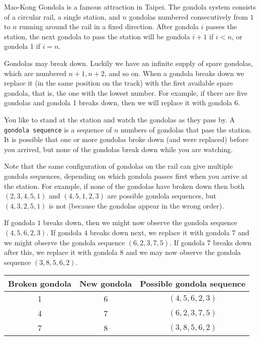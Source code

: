 Mao-Kong Gondola is a famous attraction in Taipei. The gondola system consists of a circular rail, a single station, and $n$ gondolas numbered consecutively from $1$ to $n$ running around the rail in a fixed direction. After gondola $i$ passes the station, the next gondola to pass the station will be gondola $i + 1$ if $i < n$, or gondola 1 if $i = n$.

Gondolas may break down. Luckily we have an infinite supply of spare gondolas, which are numbered $n + 1, n + 2$, and so on. When a gondola breaks down we replace it (in the same position on the track) with the first available spare gondola, that is, the one with the lowest number. For example, if there are five gondolas and gondola 1 breaks down, then we will replace it with gondola 6.

You like to stand at the station and watch the gondolas as they pass by. A \texttt{gondola sequence} is a sequence of $n$ numbers of gondolas that pass the station. It is possible that one or more gondolas broke down (and were replaced) before you arrived, but none of the gondolas break down while you are watching.

Note that the same configuration of gondolas on the rail can give multiple gondola sequences, depending on which gondola passes first when you arrive at the station. For example, if none of the gondolas have broken down then both $(2, 3, 4, 5, 1)$ and $(4, 5, 1, 2, 3)$ are possible gondola sequences, but $(4, 3, 2, 5, 1)$ is not (because the gondolas appear in the wrong order).

If gondola $1$ breaks down, then we might now observe the gondola sequence $(4, 5, 6, 2, 3)$. If gondola $4$ breaks down next, we replace it with gondola $7$ and we might observe the gondola sequence $(6, 2, 3, 7, 5)$. If gondola $7$ breaks down after this, we replace it with gondola $8$ and we may now observe the gondola sequence $(3, 8, 5, 6, 2)$.

\begin{center}
\renewcommand{\arraystretch}{1.5}
\begin{tabular}{|c|c|c|}
\hline
Broken gondola & New gondola & Possible gondola sequence \\
\hline
1 &  6 & $(4, 5, 6, 2, 3)$ \\
\hline
4 & 7 & $(6, 2, 3, 7, 5)$ \\
\hline
7 & 8 & $(3, 8, 5, 6, 2)$ \\
\hline
\end{tabular}
\end{center}

